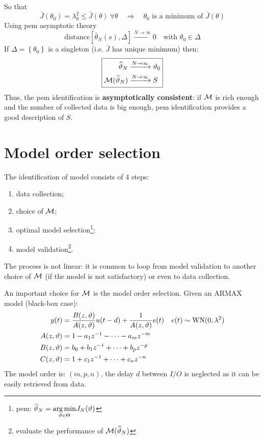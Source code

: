 So that
\begin{equation*}
\bar{J}\left(\theta _{0}\right) = \lambda _{0}^{2} \leq \bar{J}(\theta)\  \forall \theta \quad\Longrightarrow\quad \theta _{0} \text{ is a minimum of } \bar{J}(\theta)
\end{equation*}
Using \gls{pem} asymptotic theory
\begin{equation*}
\text{distance}[\hat{\theta}_{N}(s), \Delta]\xrightarrow{N\to\infty} 0 \quad \text{with }\theta_{0} \in \Delta 
\end{equation*}
If $ \Delta =\left\{\theta _{0}\right\}$ is a singleton (i.e. $ \bar{J}$ has unique minimum) then:
\[
	\boxed{
		\begin{aligned}
			\widehat{\vartheta }_{N} & \xrightarrow{N\rightarrow \infty} \vartheta _{0}\\
			\mathcal{M}(\widehat{\vartheta }_{N}) & \xrightarrow{N\rightarrow \infty} S
		\end{aligned}
	}
\]
Thus, the \gls{pem} identification is \textbf{asymptotically consistent}: if $ \mathcal{M}$ is rich enough and the number of collected data is big enough, \gls{pem} identification provides a good description of $ S$.



\section{Model order selection}

The identification of model consists of 4 steps:
\begin{enumerate}
\item data collection;
\item choice of $ \mathcal{M}$;
\item optimal model selection\footnote{\gls{pem}: $ \widehat{\vartheta }_{N} =\underset{\vartheta \in \Theta }{\operatorname*{arg\,min}} J_{N}(\vartheta)$};
\item model validation\footnote{evaluate the performance of $\mathcal{M}(\widehat{\vartheta }_{N})$}.
\end{enumerate}

The process is not linear: it is common to loop from model validation to another choice of $ \mathcal{M}$ (if the model is not satisfactory) or even to data collection.

An important choice for $ \mathcal{M}$ is the model order selection. Given an ARMAX model (black-box case):
\begin{gather*}
\begin{aligned}
y(t)  & =\frac{B(z,\vartheta)}{A(z,\vartheta)} u(t-d) +\frac{1}{A(z,\vartheta)} e(t) & e(t) \sim \operatorname{WN} (0,\lambda ^{2})\\
A(z,\vartheta)  & =1-a_{1} z^{-1} -\cdots -a_{m} z^{-m} & \\
B(z,\vartheta) & =b_{0} +b_{1} z^{-1} +\cdots +b_{p} z^{-p} & \\
C(z,\vartheta) & =1+c_{1} z^{-1} +\cdots +c_{n} z^{-n} & 
\end{aligned}\\
\end{gather*}
The model order is: $ (m,p,n)$, the delay $ d$ between $ I/O$ is neglected as it can be easily retrieved from data.

